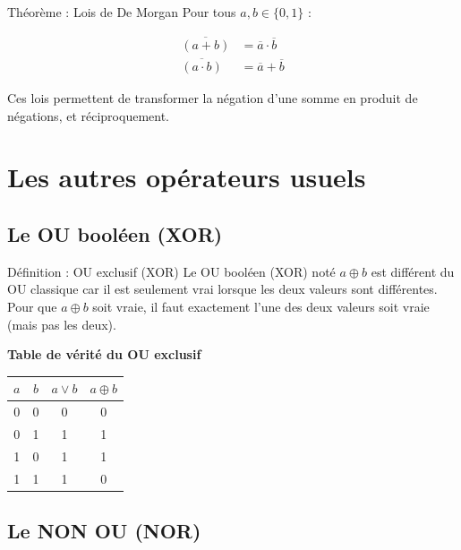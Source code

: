 \documentclass[a4paper,12pt]{article}
\begin{document}
\begin{theorembox}{Théorème : Lois de De Morgan}
Pour tous $a, b \in \{0,1\}$ :

\begin{align*}
\overline{(a + b)} &= \overline{a} \cdot \overline{b} \\[0.5em]
\overline{(a \cdot b)} &= \overline{a} + \overline{b}
\end{align*}

Ces lois permettent de transformer la négation d'une somme en produit de négations, et réciproquement.
\end{theorembox}

\newpage
\section{Les autres opérateurs usuels}

\subsection{Le OU booléen (XOR)}

\begin{defbox}{Définition : OU exclusif (XOR)}
Le OU booléen (XOR) noté $a \oplus b$ est différent du OU classique car il est seulement vrai lorsque les deux valeurs sont différentes. Pour que $a \oplus b$ soit vraie, il faut exactement l'une des deux valeurs soit vraie (mais pas les deux).
\end{defbox}

\vspace{0.5cm}

\begin{center}
\textbf{Table de vérité du OU exclusif}
\vspace{0.3cm}

\begin{tabular}{|c|c|c|c|}
\hline
$a$ & $b$ & $a \vee b$ & $a \oplus b$ \\
\hline
0 & 0 & 0 & 0 \\
\hline
0 & 1 & 1 & 1 \\
\hline
1 & 0 & 1 & 1 \\
\hline
1 & 1 & 1 & 0 \\
\hline
\end{tabular}
\end{center}

\subsection{Le NON OU (NOR)}
\end{document}
